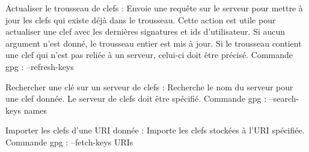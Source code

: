 Actualiser le trousseau de clefs : 
    Envoie une requête sur le serveur pour mettre à jour les clefs qui existe déjà dans le trousseau. Cette action est utile pour actualiser une clef
    avec les dernières signatures et ids d'utilisateur. Si aucun argument n'est donné, le trousseau entier est mis à jour. Si le trousseau contient une clef qui n'est pas reliée à un serveur, celui-ci doit être précisé.
    Commande gpg : --refresh-keys

Rechercher une clé sur un serveur de clefs : 
    Recherche le nom du serveur pour une clef donnée. Le serveur de clefs doit être spécifié. 
    Commande gpg : --search-keys names

Importer les clefs d'une URI donnée : 
    Importe les clefs stockées à l'URI spécifiée.
    Commande gpg : --fetch-keys URIs